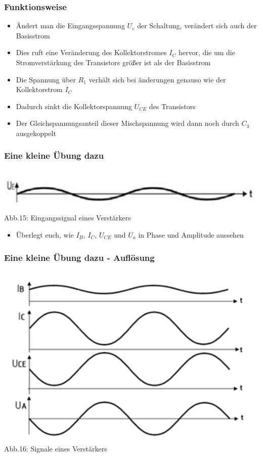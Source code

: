 \begin{frame}
	\frametitle{Funktionsweise}
	\begin{itemize}
		\item	Ändert man die Eingangsspannung $U_e$ der Schaltung, verändert sich auch der Basisstrom
		\item	Dies ruft eine Veränderung des Kollektorstromes $I_C$ hervor, die um die Stromverstärkung des Transistors größer ist als der Basisstrom
		\item	Die Spannung über $R_1$ verhält sich bei änderungen genauso wie der Kollektorstrom $I_C$
		\item	Dadurch sinkt die Kollektorspannung $U_{CE}$ des Transistors
		\item	Der Gleichspannungsanteil dieser Mischspannung wird dann noch durch $C_3$ ausgekoppelt 
	\end{itemize}
\end{frame}

\begin{frame}
	\frametitle{Eine kleine Übung dazu}
	\begin{center}
		\includegraphics[scale=0.6]{a06/Transistor-Diagramm.png}\\
		Abb.15: Eingangssignal eines Verstärkers \cite{bnetza}
	\end{center}
	\begin{itemize}
		\item	Überlegt euch, wie $I_B$, $I_C$, $U_{CE}$ und $U_a$ in Phase und Amplitude aussehen 
	\end{itemize}
\end{frame}

\begin{frame}
	\frametitle{Eine kleine Übung dazu - Auflösung}
	\begin{center}
		\includegraphics[scale=0.6]{a06/Transistor-Diagramm-compl.png}\\
		Abb.16: Signale eines Verstärkers \cite{bnetza}
	\end{center}
\end{frame}

